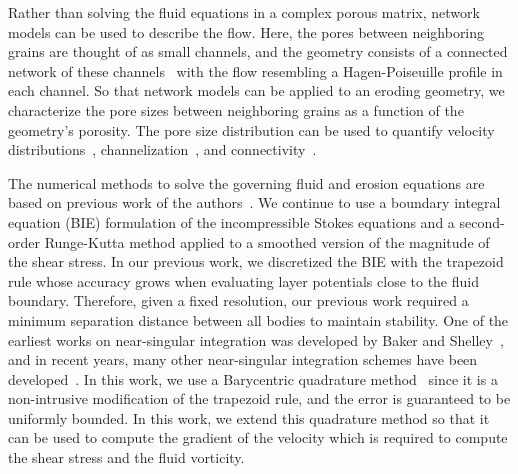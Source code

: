 \documentclass[preprint, 10pt]{elsarticle}
\begin{document}
Rather than solving the fluid equations in a complex porous matrix,
network models can be used to describe the flow.  Here, the pores
between neighboring grains are thought of as small channels, and the
geometry consists of a connected network of these
channels~\cite{bry-kin-mel1993, bry-mel-cad1993, bij-blu2006} with the
flow resembling a Hagen-Poiseuille profile in each channel.  So that
network models can be applied to an eroding geometry, we characterize
the pore sizes between neighboring grains as a function of the
geometry's porosity.  The pore size distribution can be used to quantify
velocity distributions~\cite{ali-par-wei-bre2017, dea-qua-bir-jua2018},
channelization~\cite{sie-ili-pri-riv-gua2019}, and
connectivity~\cite{knu-car2005, wes-blo-gra2001}.

The numerical methods to solve the governing fluid and erosion equations
are based on previous work of the authors~\cite{qua-moo2018}.  We
continue to use a boundary integral equation (BIE) formulation of the
incompressible Stokes equations and a second-order Runge-Kutta method
applied to a smoothed version of the magnitude of the shear stress.  In
our previous work, we discretized the BIE with the trapezoid rule whose
accuracy grows when evaluating layer potentials close to the fluid
boundary.  Therefore, given a fixed resolution, our previous work
required a minimum separation distance between all bodies to maintain
stability.  One of the earliest works on near-singular integration was
developed by Baker and Shelley~\cite{bak-she1986}, and in recent years,
many other near-singular integration schemes have been
developed~\cite{oja-tor2015, kli-tor2018, hel-oja2008a, bea-yin-wil2016,
bea-lai2001, klo-bar-gre-one2013}.  In this work, we use a Barycentric
quadrature method~\cite{bar2014, bar-wu-vee2015} since it is a
non-intrusive modification of the trapezoid rule, and the error is
guaranteed to be uniformly bounded.  In this work, we extend this
quadrature method so that it can be used to compute the gradient of the
velocity which is required to compute the shear stress and the fluid
vorticity. 
\end{document}
